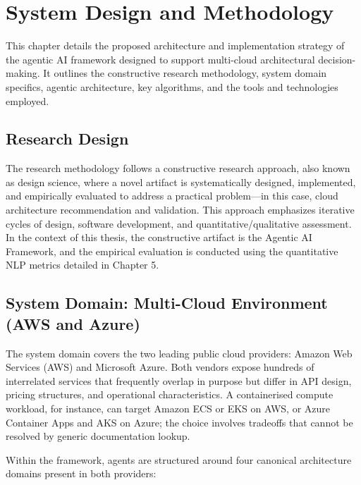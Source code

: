 \chapter{System Design and Methodology}

This chapter details the proposed architecture and implementation strategy of the agentic AI framework designed to support multi-cloud architectural decision-making. It outlines the constructive research methodology, system domain specifics, agentic architecture, key algorithms, and the tools and technologies employed.

\section{Research Design}

The research methodology follows a constructive research approach, also known as design science, where a novel artifact is systematically designed, implemented, and empirically evaluated to address a practical problem—in this case, cloud architecture recommendation and validation. This approach emphasizes iterative cycles of design, software development, and quantitative/qualitative assessment. In the context of this thesis, the constructive artifact is the Agentic AI Framework, and the empirical evaluation is conducted using the quantitative NLP metrics detailed in Chapter 5.

\section{System Domain: Multi-Cloud Environment (AWS and Azure)}

The system domain covers the two leading public cloud providers: Amazon Web Services (AWS) and Microsoft Azure. Both vendors expose hundreds of interrelated services that frequently overlap in purpose but differ in API design, pricing structures, and operational characteristics. A containerised compute workload, for instance, can target Amazon ECS or EKS on AWS, or Azure Container Apps and AKS on Azure; the choice involves tradeoffs that cannot be resolved by generic documentation lookup.

Within the framework, agents are structured around four canonical architecture domains present in both providers:

